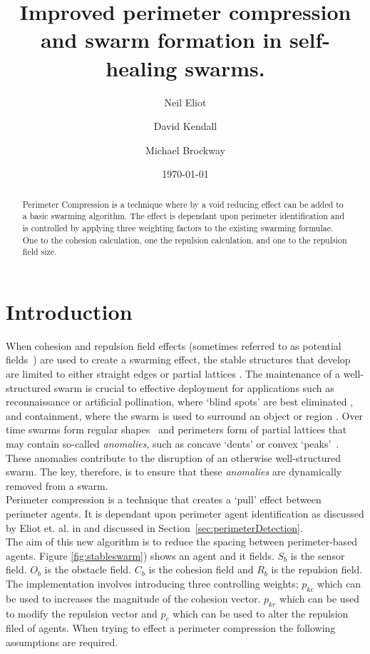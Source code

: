 \documentclass[12pt,a4paper]{IEEEtran}
\title{Improved perimeter compression and swarm formation in self-healing swarms.}
\author[1,*]{Neil Eliot}
\author[2]{David Kendall}
\author[2]{Michael Brockway}
\affil[1] {Northumbria University, Faculty of Engineering and Environment, Department of Computer and Information Sciences}
\affil[2] {Hexham University, Faculty of Computer Science}
\affil[*] {Corresponding author: Dr Neil Eliot, neil.eliot@northumbria.ac.uk}
\date{\today}
\begin{document}
\maketitle

\begin{abstract}
Perimeter Compression is a technique where by a void reducing effect can be added to a basic swarming algorithm. The effect is dependant upon perimeter identification and is controlled by applying three weighting factors to the existing swarming formulae. One to the cohesion calculation, one the repulsion calculation, and one to the repulsion field size.
\end{abstract}

\section{Introduction}
When cohesion and repulsion field effects (sometimes referred to as potential fields~\cite{BAF:06,eliot2018metric,VG:05,SW:03,Son2017,liang2019swarm}) are used to create a swarming effect, the stable structures that develop are limited to either straight edges or partial lattices \cite{eliot2017methods}. The maintenance of a well-structured swarm is crucial to effective deployment for applications such as reconnaissance or artificial pollination, where `blind spots' are best eliminated \cite{elamvazhuthi2015optimal}, and containment, where the swarm is used to surround an object or region \cite{cao2012distributed}. Over time swarms form regular shapes~\cite{RAZ:13} and perimeters form of partial lattices that may contain so-called \textit{anomalies}, such as concave `dents' or convex `peaks'~\cite{eliot2019void}. These anomalies contribute to the disruption of an otherwise well-structured swarm. The key, therefore, is to ensure that these \textit{anomalies} are dynamically removed from a swarm.\\
Perimeter compression is a technique that creates a `pull' effect between perimeter agents. It is dependant upon perimeter agent identification as discussed by Eliot et. al. in \cite{eliot2017methods, eliot2018metric, eliot2019void} and discussed in Section~\ref{sec:perimeterDetection}.\\
The aim of this new algorithm is to reduce the spacing between perimeter-based agents. Figure \ref{fig:stableswarm}) shows an agent and it fields. $S_b$ is the sensor field. $O_b$ is the obstacle field. $C_b$ is the cohesion field and $R_b$ is the repulsion field. The implementation involves introducing three controlling weights; $p_{kc}$ which can be used to increases the magnitude of the cohesion vector. $p_{kr}$ which can be used to modify the repulsion vector and $p_{c}$ which can be used to alter the repulsion filed of agents. When trying to effect a perimeter compression the following assumptions are required.\\
\end{document}
